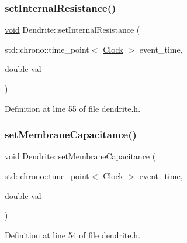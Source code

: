 \subsubsection{\texorpdfstring{set\+Internal\+Resistance()}{setInternalResistance()}}
{\footnotesize\ttfamily \mbox{\hyperlink{glad_8h_a950fc91edb4504f62f1c577bf4727c29}{void}} Dendrite\+::set\+Internal\+Resistance (\begin{DoxyParamCaption}\item[{std\+::chrono\+::time\+\_\+point$<$ \mbox{\hyperlink{universe_8h_a0ef8d951d1ca5ab3cfaf7ab4c7a6fd80}{Clock}} $>$}]{event\+\_\+time,  }\item[{double}]{val }\end{DoxyParamCaption})\hspace{0.3cm}{\ttfamily [inline]}}



Definition at line 55 of file dendrite.\+h.

\mbox{\label{class_dendrite_a6fed149ffe00cf781a41a9f260f8eeb2}} 
\subsubsection{\texorpdfstring{set\+Membrane\+Capacitance()}{setMembraneCapacitance()}}
{\footnotesize\ttfamily \mbox{\hyperlink{glad_8h_a950fc91edb4504f62f1c577bf4727c29}{void}} Dendrite\+::set\+Membrane\+Capacitance (\begin{DoxyParamCaption}\item[{std\+::chrono\+::time\+\_\+point$<$ \mbox{\hyperlink{universe_8h_a0ef8d951d1ca5ab3cfaf7ab4c7a6fd80}{Clock}} $>$}]{event\+\_\+time,  }\item[{double}]{val }\end{DoxyParamCaption})\hspace{0.3cm}{\ttfamily [inline]}}



Definition at line 54 of file dendrite.\+h.

\mbox{\label{class_dendrite_af6141643bf2c85404ae9c320611d1d31}} 
